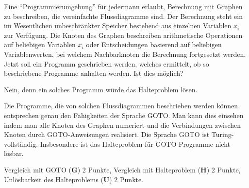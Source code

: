 Eine ``Programmierumgebung'' für jedermann erlaubt, Berechnung mit
Graphen zu beschreiben, die vereinfachte Flussdiagramme sind.
Der Berechnung steht ein im Wesentlichen unbeschränkter Speicher
bestehend aus einzelnen Variablen $x_i$
zur Verfügung.
Die Knoten des Graphen beschreiben arithmetische Operationen auf beliebigen
Variablen $x_i$ oder Entscheidungen basierend auf beliebigen Variablenwerten,
bei welchem Nachbarknoten die Berechnung fortgesetzt werden.
Jetzt soll ein Programm geschrieben werden, welches ermittelt,
ob so beschriebene Programme anhalten werden.
Ist dies möglich?

\begin{loesung}
Nein, denn ein solches Programm  würde das Halteproblem lösen.

Die Programme, die von solchen Flussdiagrammen beschrieben werden
können, entsprechen genau den Fähigkeiten der Sprache GOTO.
Man kann dies einsehen indem man alle Knoten des Graphen numeriert und
die Verbindungen zwischen Knoten durch GOTO-Anweisungen realisiert.
Die Sprache GOTO ist Turing-vollständig.
Insbesondere ist das Halteproblem für GOTO-Programme nicht lösbar.
\end{loesung}

\begin{bewertung}
Vergleich mit GOTO ({\bf G}) 2 Punkte,
Vergleich mit Halteproblem ({\bf H}) 2 Punkte,
Unlösbarkeit des Halteproblems ({\bf U}) 2 Punkte.
\end{bewertung}




